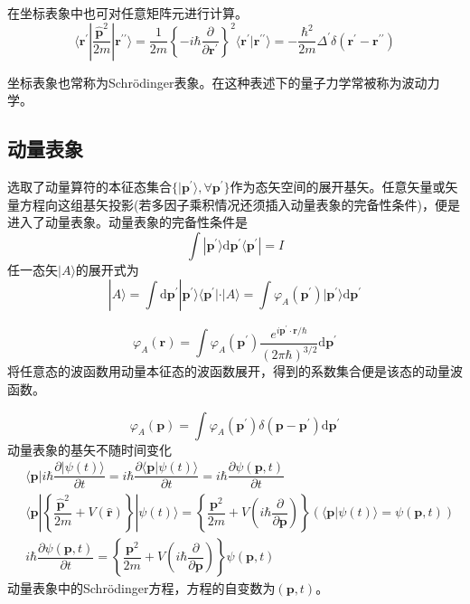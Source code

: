 \documentclass[11pt,a4paper]{article}
\renewcommand{\vec}[1]{\boldsymbol{#1}}
\newcommand{\dif}{\mathrm{d}}
\begin{document}
在坐标表象中也可对任意矩阵元进行计算。
\begin{equation}
\langle \vec{r}^\prime | \dfrac{\vec{\hat{p}}^2}{2m} | \vec{r}^{\prime \prime} \rangle = \dfrac{1}{2m} \left\{-i\hbar \dfrac{\partial}{\partial \vec{r}^\prime} \right\}^2 \langle \vec{r}^\prime | \vec{r}^{\prime \prime} \rangle = -\dfrac{\hbar^2}{2m} \Delta^\prime \delta(\vec{r}^\prime - \vec{r}^{\prime\prime})
\end{equation}

坐标表象也常称为Schr\"odinger表象。在这种表述下的量子力学常被称为波动力学。

\subsection{动量表象}
选取了动量算符的本征态集合$\{|\vec{p}^\prime \rangle, \forall \vec{p}^\prime\}$作为态矢空间的展开基矢。任意矢量或矢量方程向这组基矢投影(若多因子乘积情况还须插入动量表象的完备性条件)，便是进入了动量表象。动量表象的完备性条件是
\begin{equation}
\int |\vec{p}^\prime \rangle \dif \vec{p}^\prime \langle \vec{p}^\prime |  = I
\end{equation}
任一态矢$|A \rangle$的展开式为
\begin{equation}
|A \rangle = \int \dif \vec{p}^\prime |\vec{p}^\prime \rangle  \langle \vec{p}^\prime | \cdot |A\rangle = \int \varphi_A(\vec{p}^\prime) |\vec{p}^\prime \rangle \dif \vec{p}^\prime
\end{equation}

\begin{equation}
\varphi_A(\vec{r}) = \int \varphi_A(\vec{p}^\prime) \dfrac{e^{i\vec{p}^\prime \cdot \vec{r}/\hbar}}{(2\pi \hbar)^{3/2}} \dif \vec{p}^\prime
\end{equation}
将任意态的波函数用动量本征态的波函数展开，得到的系数集合便是该态的动量波函数。

\begin{equation}
\varphi_A(\vec{p}) = \int \varphi_A(\vec{p}^\prime) \delta(\vec{p} -\vec{p}^\prime) \dif \vec{p}^\prime
\end{equation}
动量表象的基矢不随时间变化
\begin{align}
\nonumber & \langle \vec{p} | i\hbar \dfrac{\partial |\psi(t) \rangle}{\partial t}  = i\hbar \dfrac{\partial \langle \vec{p} |\psi(t) \rangle}{\partial t} = i\hbar \dfrac{\partial \psi(\vec{p}, t) }{\partial t} \\
\nonumber & \langle \vec{p} | \left\{\dfrac{\vec{\hat{p}}^2}{2m} +V(\vec{\hat{r}}) \right\}  |\psi(t) \rangle = \left\{\dfrac{\vec{p}^2}{2m} +V\left(i\hbar \dfrac{\partial}{\partial \vec{p}} \right) \right\} (\langle \vec{p} | \psi(t) \rangle =  \psi(\vec{p}, t) ) \\
& i\hbar \dfrac{\partial \psi(\vec{p}, t)}{\partial t} = \left\{\dfrac{\vec{p}^2}{2m} + V\left(i\hbar \dfrac{\partial}{\partial \vec{p}} \right) \right\} \psi(\vec{p}, t)
\end{align}
动量表象中的Schr\"odinger方程，方程的自变数为$(\vec{p}, t)$。
\end{document}
